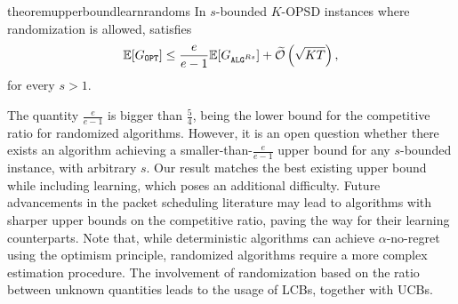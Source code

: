 \begin{restatable}{theorem}{upperboundlearnrandoms}
\label{thr:upperboundrs}
     In $s$-bounded $K$-OPSD instances where randomization is allowed, \algrs satisfies
    \begin{equation}
        \mathbb{E}[\Gopt] \le \frac{e}{e-1} \mathbb{E}[\Galgrs] + \widetilde{\mathcal{O}}\left(\sqrt{KT}\right),
    \end{equation}
    for every $s >1$.
\end{restatable}
The quantity $\frac{e}{e-1}$ is bigger than $\frac{5}{4}$, being the lower bound for the competitive ratio for randomized algorithms. However, it is an open question whether there exists an algorithm achieving a smaller-than-$\frac{e}{e-1}$ upper bound for any $s$-bounded instance, with arbitrary $s$. Our result matches the best existing upper bound while including learning, which poses an additional difficulty. Future advancements in the packet scheduling literature may lead to algorithms with sharper upper bounds on the competitive ratio, paving the way for their learning counterparts. Note that, while deterministic algorithms can achieve $\alpha$-no-regret using the optimism principle, randomized algorithms require a more complex estimation procedure. The involvement of randomization based on the ratio between unknown quantities leads to the usage of LCBs, together with UCBs.